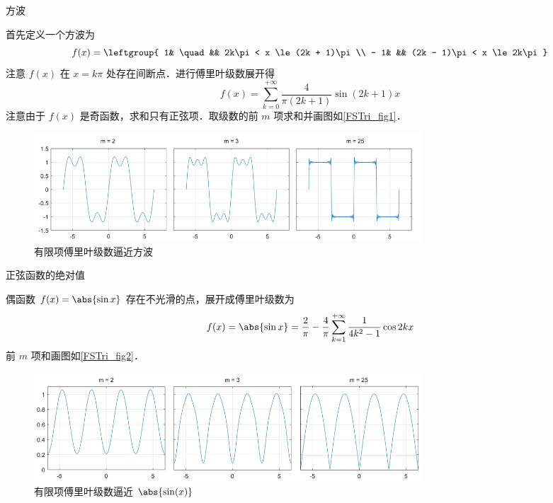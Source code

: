 
\begin{exam}{方波}

首先定义一个方波为
\begin{equation}
f(x) = \leftgroup{
1& \quad && 2k\pi < x \le (2k + 1)\pi \\
- 1& &&   (2k - 1)\pi < x \le 2k\pi 
}\end{equation}
注意 $f(x)$ 在 $x=k\pi$ 处存在间断点．进行傅里叶级数展开得
\begin{equation}
f(x) = \sum_{k = 0}^{+\infty} \frac{4}{\pi (2k + 1)}\sin (2k + 1)x
\end{equation}
注意由于 $f(x)$ 是奇函数，求和只有正弦项．取级数的前 $m$ 项求和并画图如\autoref{FSTri_fig1}．

\begin{figure}[ht]
\centering
\includegraphics[width=14.5cm]{./figures/FSTri1.pdf}
\caption{有限项傅里叶级数逼近方波}\label{FSTri_fig1}
\end{figure}
\end{exam}

\begin{exam}{正弦函数的绝对值} %

偶函数 $f(x) = \abs{\sin x}$ 存在不光滑的点，展开成傅里叶级数为
\begin{equation}
f(x) = \abs{\sin x} = \frac{2}{\pi } - \frac{4}{\pi }\sum_{k = 1}^{+\infty} \frac{1}{4 k^2 - 1}\cos 2k x
\end{equation}
前 $m$ 项和画图如\autoref{FSTri_fig2}．
\begin{figure}[ht]
\centering
\includegraphics[width=14.5cm]{./figures/FSTri2.pdf}
\caption{有限项傅里叶级数逼近 $\abs{\sin(x)}$}\label{FSTri_fig2}
\end{figure}
\end{exam}


